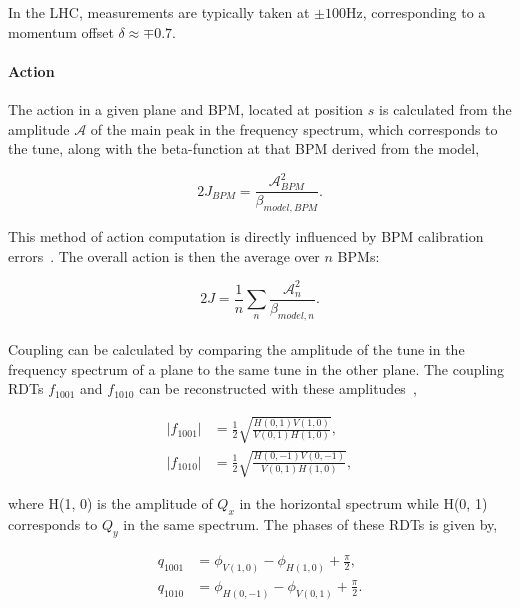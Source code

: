 In the LHC, measurements are typically taken at $\pm 100$Hz, corresponding to a momentum offset 
$\delta \approx \mp0.7$.


\paragraph{Action} 
The action in a given plane and BPM, located at position $s$ is calculated from the amplitude
$\mathcal{A}$ of the main peak in the frequency spectrum, which corresponds to the tune, along with
the beta-function at that BPM derived from the model,

\begin{equation}
    2J_{BPM} = \frac{\mathcal{A}_{BPM}^2}{\beta_{model,BPM}}.
\end{equation}

This method of action computation is directly influenced by BPM calibration
errors~\cite{garcia-tabares_valdivieso_optics-measurement-based_2020}. The overall action is then
the average over $n$ BPMs:

\begin{equation}
    2J = \frac{1}{n} \sum_n \frac{\mathcal{A}_n^2}{\beta_{model,n}}.
\end{equation}


\paragraph{}

Coupling can be calculated by comparing the amplitude of the tune in the frequency spectrum of a
plane to the same tune in the other plane. The coupling RDTs $f_{1001}$ and $f_{1010}$ can be
reconstructed with these amplitudes~\cite{franchi_computation_2010,tomas_cern_2010},

\begin{equation}
    \begin{aligned}
        |f_{1001}| &= \frac{1}{2} \sqrt{\frac{H(0,1)V(1,0)}{V(0,1)H(1,0)}}, \\
        |f_{1010}| &= \frac{1}{2} \sqrt{\frac{H(0,-1)V(0,-1)}{V(0,1)H(1,0)}},
    \end{aligned}
\end{equation}

where H(1, 0) is the amplitude of $Q_x$ in the horizontal spectrum while H(0, 1) corresponds to
$Q_y$ in the same spectrum. The phases of these RDTs is given by,

\begin{equation}
    \begin{aligned}
        q_{1001} &= \phi_{V(1,0)}  - \phi_{H(1,0)} + \frac{\pi}{2}, \\
        q_{1010} &= \phi_{H(0,-1)} - \phi_{V(0,1)} + \frac{\pi}{2}.
    \end{aligned}
\end{equation}

